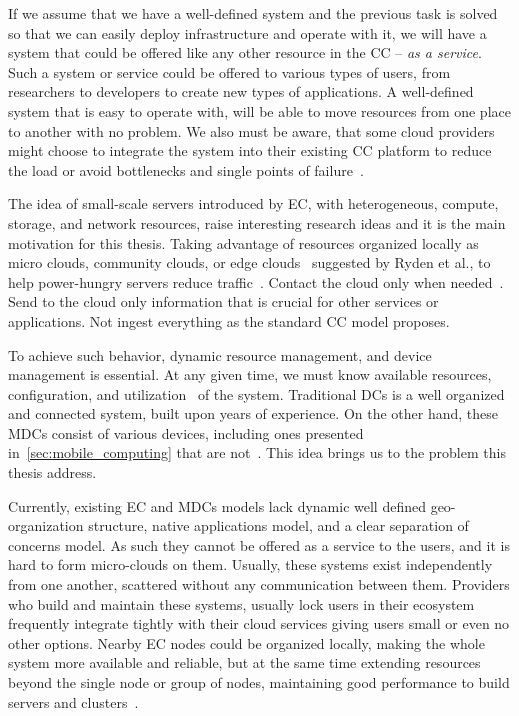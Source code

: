If we assume that we have a well-defined system and the previous task is solved so that we can easily deploy infrastructure and operate with it, we will have a system that could be offered like any other resource in the CC -- \emph{as a service}. Such a system or service could be offered to various types of users, from researchers to developers to create new types of applications. A well-defined system that is easy to operate with, will be able to move resources from one place to another with no problem. We also must be aware, that some cloud providers might choose to integrate the system into their existing CC platform to reduce the load or avoid bottlenecks and single points of failure~\cite{JararwehDAAAB16}.

The idea of small-scale servers introduced by EC, with heterogeneous, compute, storage, and network resources, raise interesting research ideas and it is the main motivation for this thesis. Taking advantage of resources organized locally as micro clouds, community clouds, or edge clouds~\cite{RydenOCW14} suggested by Ryden et al., to help power-hungry servers reduce traffic~\cite{HirschMZ18}. Contact the cloud only when needed~\cite{inproceedingsSimic1}. Send to the cloud only information that is crucial for other services or applications. Not ingest everything as the standard CC model proposes.

To achieve such behavior, dynamic resource management, and device management is essential. At any given time, we must know available resources, configuration, and utilization~\cite{GubbiBMP13, WangZZWYW17} of the system. Traditional DCs is a well organized and connected system, built upon years of experience. On the other hand, these MDCs consist of various devices, including ones presented in~\ref{sec:mobile_computing} that are not~\cite{JiangCGZW19}. This idea brings us to the problem this thesis address.

Currently, existing EC and MDCs models lack dynamic well defined geo-organization structure, native applications model, and a clear separation of concerns model. As such they cannot be offered as a service to the users, and it is hard to form micro-clouds on them. Usually, these systems exist independently from one another, scattered without any communication between them. Providers who build and maintain these systems, usually lock users in their ecosystem frequently integrate tightly with their cloud services giving users small or even no other options. Nearby EC nodes could be organized locally, making the whole system more available and reliable, but at the same time extending resources beyond the single node or group of nodes, maintaining good performance to build servers and clusters~\cite{ArocaG12}.

